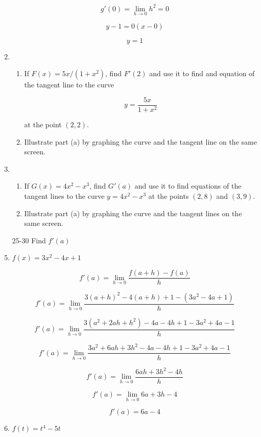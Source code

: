 \documentclass{article}
\begin{document}
\begin{enumerate}
		$$g'(0) = \lim \limits _{h \to 0} h^2 = 0$$

		$$y - 1 = 0(x - 0)$$

		$$y = 1$$

		\item 
		\begin{enumerate}
			\item If $F(x) = 5x/(1 + x^2)$, find $F'(2)$ and use it to find and equation of the tangent
				line to the curve

				$$y = \frac{5x}{1 + x^2}$$

				at the point $(2,2)$.

			\item Illustrate part (a) by graphing the curve and the tangent line on the same screen.
		\end{enumerate}

		\item
		\begin{enumerate}
			\item If $G(x) = 4x^2 - x^3$, find $G'(a)$ and use it to find equations of the tangent lines
				to the curve $y = 4x^2 - x^3$ at the points $(2,8)$ and $(3,9)$.

			\item Illustrate part (a) by graphing the curve and the tangent lines on the same screen.
		\end{enumerate}

		\item[25-30] Find $f'(a)$

		\item $f(x) = 3x^2 - 4x + 1$
			
			$$f'(a) = \lim \limits _{h \to 0} \frac{f(a+h) - f(a)}{h}$$

			$$f'(a) = \lim \limits _{h \to 0} \frac{3(a+h)^2 - 4(a+h) + 1 - (3a^2 - 4a + 1)}{h}$$

			$$f'(a) = \lim \limits _{h \to 0} \frac{3(a^2+2ah+h^2) - 4a - 4h + 1 - 3a^2 + 4a - 1}{h}$$

			$$f'(a) = \lim \limits _{h \to 0} \frac{3a^2 + 6ah + 3h^2 - 4a - 4h + 1 - 3a^2 + 4a - 1}{h}$$

			$$f'(a) = \lim \limits _{h \to 0} \frac{6ah + 3h^2 - 4h}{h}$$

			$$f'(a) = \lim \limits _{h \to 0} 6a + 3h - 4$$

			$$f'(a) = 6a - 4$$

		\item $f(t) = t^4 - 5t$


\end{enumerate}
\end{document}
